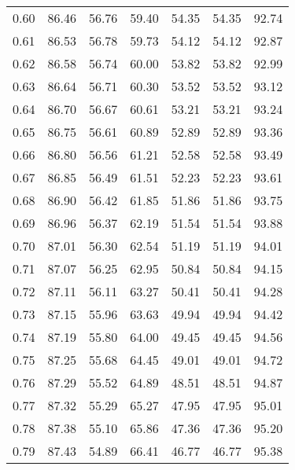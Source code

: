\begin{tabular}{|c|c|c|c|c|c|c|}
      0.60 &     86.46 &     56.76 &      59.40 &   54.35 &      54.35 &         92.74 \\
      0.61 &     86.53 &     56.78 &      59.73 &   54.12 &      54.12 &         92.87 \\
      0.62 &     86.58 &     56.74 &      60.00 &   53.82 &      53.82 &         92.99 \\
      0.63 &     86.64 &     56.71 &      60.30 &   53.52 &      53.52 &         93.12 \\
      0.64 &     86.70 &     56.67 &      60.61 &   53.21 &      53.21 &         93.24 \\
      0.65 &     86.75 &     56.61 &      60.89 &   52.89 &      52.89 &         93.36 \\
      0.66 &     86.80 &     56.56 &      61.21 &   52.58 &      52.58 &         93.49 \\
      0.67 &     86.85 &     56.49 &      61.51 &   52.23 &      52.23 &         93.61 \\
      0.68 &     86.90 &     56.42 &      61.85 &   51.86 &      51.86 &         93.75 \\
      0.69 &     86.96 &     56.37 &      62.19 &   51.54 &      51.54 &         93.88 \\
      0.70 &     87.01 &     56.30 &      62.54 &   51.19 &      51.19 &         94.01 \\
      0.71 &     87.07 &     56.25 &      62.95 &   50.84 &      50.84 &         94.15 \\
      0.72 &     87.11 &     56.11 &      63.27 &   50.41 &      50.41 &         94.28 \\
      0.73 &     87.15 &     55.96 &      63.63 &   49.94 &      49.94 &         94.42 \\
      0.74 &     87.19 &     55.80 &      64.00 &   49.45 &      49.45 &         94.56 \\
      0.75 &     87.25 &     55.68 &      64.45 &   49.01 &      49.01 &         94.72 \\
      0.76 &     87.29 &     55.52 &      64.89 &   48.51 &      48.51 &         94.87 \\
      0.77 &     87.32 &     55.29 &      65.27 &   47.95 &      47.95 &         95.01 \\
      0.78 &     87.38 &     55.10 &      65.86 &   47.36 &      47.36 &         95.20 \\
      0.79 &     87.43 &     54.89 &      66.41 &   46.77 &      46.77 &         95.38 \\

\end{tabular}

